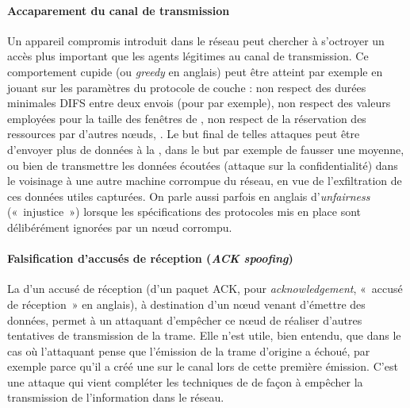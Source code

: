         \paragraph{Accaparement du canal de transmission}
Un appareil compromis introduit dans le réseau peut chercher à s'octroyer un accès plus important que les agents légitimes au canal de transmission.
Ce comportement cupide (ou \textit{greedy} en anglais) peut être atteint par exemple en jouant sur les paramètres du protocole de couche \mac: non respect des durées minimales DIFS entre deux envois (pour \ieeee par exemple), non respect des valeurs employées pour la taille des fenêtres de , non respect de la réservation des ressources par d'autres nœuds, \etc.
Le but final de telles attaques peut être d'envoyer plus de données à la \sdb, dans le but par exemple de fausser une moyenne, ou bien de transmettre les données écoutées (attaque sur la confidentialité) dans le voisinage à une autre machine corrompue du réseau, en vue de l'exfiltration de ces données utiles capturées.
On parle aussi parfois en anglais d'\textit{unfairness} (« injustice ») lorsque les spécifications des protocoles mis en place sont délibérément ignorées par un nœud corrompu.

        \paragraph{Falsification d'accusés de réception (\textit{ACK spoofing})}
La  d'un accusé de réception (d'un paquet ACK, pour \textit{acknowledgement}, « accusé de réception » en anglais), à destination d'un nœud venant d'émettre des données, permet à un attaquant d'empêcher ce nœud de réaliser d'autres tentatives de transmission de la trame.
Elle n'est utile, bien entendu, que dans le cas où l'attaquant pense que l'émission de la trame d'origine a échoué, par exemple parce qu'il a créé une  sur le canal lors de cette première émission.
C'est une attaque qui vient compléter les techniques de  de façon à empêcher la transmission de l'information dans le réseau.

